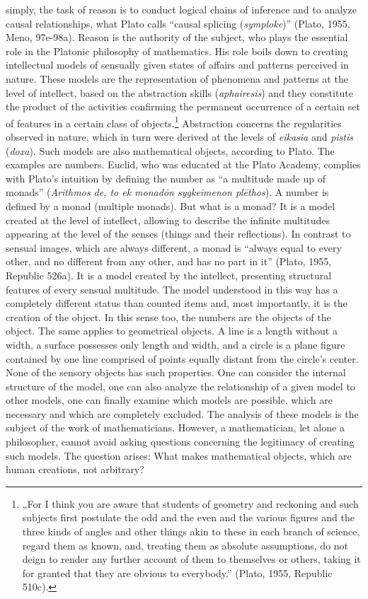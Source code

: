 \documentclass[a4paper]{article}
\begin{document}
simply, the task of reason is to conduct logical chains of inference and to analyze causal relationships, what Plato
calls “causal splicing (\textit{symploke})” \label{ref:RND1wSQpANotM}(Plato, 1955, Meno, 97e-98a). Reason is the
authority of the subject, who plays the essential role in the Platonic philosophy of mathematics. His role boils down
to creating intellectual models of sensually given states of affairs and patterns perceived in nature. These models are
the representation of phenomena and patterns at the level of intellect, based on the abstraction skills
(\textit{aphairesis}) and they constitute the product of the activities confirming the permanent occurrence of a
certain set of features in a certain class of objects.\footnote{„For I think you are aware that students of geometry
and reckoning and such subjects first postulate the odd and the even and the various figures and the three kinds of
angles and other things akin to these in each branch of science, regard them as known, and, treating them as absolute
assumptions, do not deign to render any further account of them to themselves or others, taking it for granted that
they are obvious to everybody.” \label{ref:RNDSFOMeyrE9b}(Plato, 1955, Republic 510c).} Abstraction concerns the
regularities observed in nature, which in turn were derived at the levels of \textit{eikasia} and \textit{pistis}
(\textit{doxa}). Such models are also mathematical %
objects, according to Plato. The examples are numbers. Euclid, who was educated at the Plato Academy, complies with
Plato’s intuition by defining the number as “a multitude made up of monads” (\textit{Arithmos de, to ek monad\=on
sygkeimenon pl\=ethos}). A number is defined by a monad (multiple monads). But what is a monad? It is a model created
at the level of intellect, allowing to describe the infinite multitudes appearing at the level of the senses (things
and their reflections). In contrast to sensual images, which are always different, a monad is “always equal to every
other, and no different from any other, and has no part in it” \label{ref:RNDEWaOwRPmyD}(Plato, 1955, Republic 526a).
It is a model created by the intellect, presenting structural features of every sensual multitude. The model understood
in this way has a completely different status than counted items and, most importantly, it is the creation of the
object. In this sense too, the numbers are the objects of the object. The same applies to geometrical objects. A line
is a length without a width, a surface possesses only length and width, and a circle is a plane figure contained by one
line comprised of points equally distant from the circle’s center. None of the sensory objects has such properties. One
can consider the internal structure of the model, one can also analyze the relationship of a given model to other
models, one can finally examine which models are possible, which are necessary and which are completely excluded. The
analysis of these models is the subject of the work of mathematicians. However, a mathematician, let alone a
philosopher, cannot avoid asking questions concerning the legitimacy of creating such models. The question arises: What
makes mathematical objects, which are human creations, not arbitrary?
\end{document}
